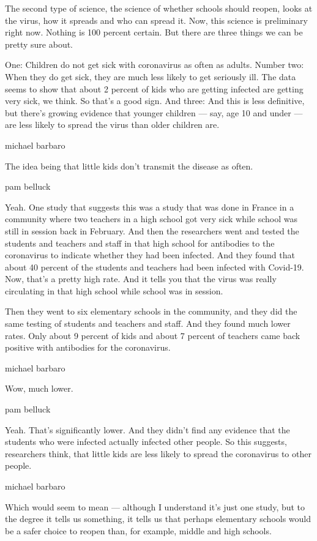 The second type of science, the science of whether schools should
reopen, looks at the virus, how it spreads and who can spread it. Now,
this science is preliminary right now. Nothing is 100 percent certain.
But there are three things we can be pretty sure about.

One: Children do not get sick with coronavirus as often as adults.
Number two: When they do get sick, they are much less likely to get
seriously ill. The data seems to show that about 2 percent of kids who
are getting infected are getting very sick, we think. So that's a good
sign. And three: And this is less definitive, but there's growing
evidence that younger children --- say, age 10 and under --- are less
likely to spread the virus than older children are.

michael barbaro

The idea being that little kids don't transmit the disease as often.

pam belluck

Yeah. One study that suggests this was a study that was done in France
in a community where two teachers in a high school got very sick while
school was still in session back in February. And then the researchers
went and tested the students and teachers and staff in that high school
for antibodies to the coronavirus to indicate whether they had been
infected. And they found that about 40 percent of the students and
teachers had been infected with Covid-19. Now, that's a pretty high
rate. And it tells you that the virus was really circulating in that
high school while school was in session.

Then they went to six elementary schools in the community, and they did
the same testing of students and teachers and staff. And they found much
lower rates. Only about 9 percent of kids and about 7 percent of
teachers came back positive with antibodies for the coronavirus.

michael barbaro

Wow, much lower.

pam belluck

Yeah. That's significantly lower. And they didn't find any evidence that
the students who were infected actually infected other people. So this
suggests, researchers think, that little kids are less likely to spread
the coronavirus to other people.

michael barbaro

Which would seem to mean --- although I understand it's just one study,
but to the degree it tells us something, it tells us that perhaps
elementary schools would be a safer choice to reopen than, for example,
middle and high schools.

